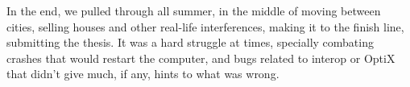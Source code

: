 In the end, we pulled through all summer, in the middle of moving between cities, selling houses and other real-life interferences, making it to the finish line, submitting the thesis. It was a hard struggle at times, specially combating crashes that would restart the computer, and bugs related to interop or OptiX that didn't give much, if any, hints to what was wrong.